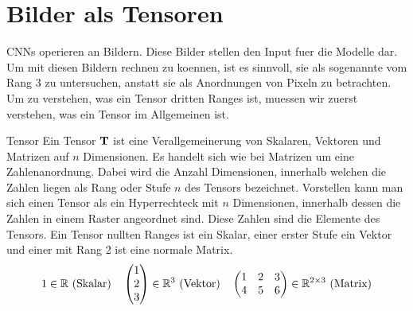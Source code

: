 \section{Bilder als Tensoren}\label{sec:tensor}
CNNs operieren an Bildern. Diese Bilder stellen den Input fuer die Modelle dar.
Um mit diesen Bildern rechnen zu koennen, ist es sinnvoll, sie als sogenannte
 vom Rang 3 zu untersuchen, anstatt sie als Anordnungen von
Pixeln zu betrachten. \\
Um zu verstehen, was ein Tensor dritten Ranges ist, muessen wir zuerst verstehen, was ein Tensor im Allgemeinen ist.

\begin{defbox}{Tensor}
  Ein Tensor $\mathbf{T}$ ist eine Verallgemeinerung von Skalaren, Vektoren und Matrizen auf
  $n$ Dimensionen. Es handelt sich wie bei Matrizen um
  eine Zahlenanordnung. Dabei wird die Anzahl Dimensionen, innerhalb welchen die
  Zahlen liegen als Rang oder Stufe $n$ des Tensors bezeichnet. Vorstellen kann man sich einen Tensor
  als ein Hyperrechteck mit $n$ Dimensionen, innerhalb dessen die Zahlen in
  einem Raster angeordnet sind. Diese Zahlen sind die Elemente des Tensors.
  Ein Tensor nullten Ranges ist ein Skalar, einer erster Stufe ein Vektor und
  einer mit Rang 2 ist eine normale Matrix.
  \begin{gather*}
    1 \in \mathbb{R} \text{ (Skalar)} \quad \begin{pmatrix} 1 \\ 2 \\ 3 \end{pmatrix}
    \in \mathbb{R}^3 \text{ (Vektor)} \quad
    \begin{pmatrix}
      1 & 2 & 3 \\
      4 & 5 & 6 \\
    \end{pmatrix} \in \mathbb{R}^{2 \times 3} \text{ (Matrix)}
  \end{gather*}
\end{defbox}

